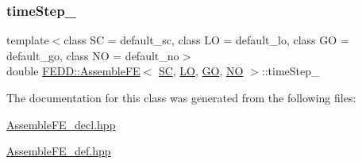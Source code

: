 \subsubsection{\texorpdfstring{time\+Step\+\_\+}{timeStep\_}}
{\footnotesize\ttfamily template$<$class SC  = default\+\_\+sc, class LO  = default\+\_\+lo, class GO  = default\+\_\+go, class NO  = default\+\_\+no$>$ \\
double \hyperlink{classFEDD_1_1AssembleFE}{F\+E\+D\+D\+::\+Assemble\+FE}$<$ \hyperlink{fe__test__laplace_8cpp_a79c7e86a57edbb2a5a53242bcd04e41e}{SC}, \hyperlink{fe__test__laplace_8cpp_ad6a38c9f07d3fd633eefca5bccad8410}{LO}, \hyperlink{fe__test__laplace_8cpp_afa2946b509009b4f45eb04bd8c5b27d9}{GO}, \hyperlink{fe__test__laplace_8cpp_a5e24f37b28787429872b6ecb1d0417ce}{NO} $>$\+::time\+Step\+\_\+\hspace{0.3cm}{\ttfamily [protected]}}



The documentation for this class was generated from the following files\+:\begin{DoxyCompactItemize}
\item 
\hyperlink{AssembleFE__decl_8hpp}{Assemble\+F\+E\+\_\+decl.\+hpp}\item 
\hyperlink{AssembleFE__def_8hpp}{Assemble\+F\+E\+\_\+def.\+hpp}\end{DoxyCompactItemize}

